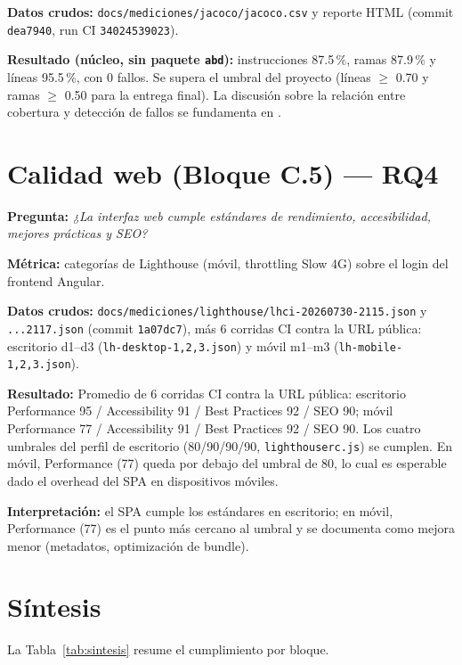 \textbf{Datos crudos:} \texttt{docs/mediciones/jacoco/jacoco.csv} y reporte HTML
(commit \texttt{dea7940}, run CI \texttt{34024539023}).

\textbf{Resultado (núcleo, sin paquete \texttt{abd}):} instrucciones 87.5\,\%,
ramas 87.9\,\% y líneas 95.5\,\%, con 0 fallos. Se supera el umbral del proyecto
(líneas $\ge$ 0.70 y ramas $\ge$ 0.50 para la entrega final). La discusión sobre la relación entre cobertura y detección de fallos se
fundamenta en \cite{inozemtseva2014,gopinath2014,gligoric2013,ivankovic2019}.

\section{Calidad web (Bloque C.5) — RQ4}
\label{sec:lighthouse}

\textbf{Pregunta:} \emph{¿La interfaz web cumple estándares de rendimiento,
accesibilidad, mejores prácticas y SEO?}

\textbf{Métrica:} categorías de Lighthouse \cite{lighthouse} (móvil, throttling Slow 4G)
sobre el login del frontend Angular.

\textbf{Datos crudos:} \texttt{docs/mediciones/lighthouse/lhci-20260730-2115.json} y
\texttt{...2117.json} (commit \texttt{1a07dc7}), más 6 corridas CI contra la URL
pública: escritorio d1--d3 (\texttt{lh-desktop-{1,2,3}.json}) y móvil m1--m3
(\texttt{lh-mobile-{1,2,3}.json}).

\textbf{Resultado:} Promedio de 6 corridas CI contra la URL pública: escritorio
Performance 95 / Accessibility 91 / Best Practices 92 / SEO 90; móvil Performance
77 / Accessibility 91 / Best Practices 92 / SEO 90. Los cuatro umbrales del
perfil de escritorio (80/90/90/90, \texttt{lighthouserc.js}) se cumplen. En móvil,
Performance (77) queda por debajo del umbral de 80, lo cual es esperable dado el
overhead del SPA en dispositivos móviles.

\textbf{Interpretación:} el SPA cumple los estándares en escritorio; en móvil,
Performance (77) es el punto más cercano al umbral y se documenta como mejora
menor (metadatos, optimización de bundle).

\section{Síntesis}
\label{sec:sintesis}

La Tabla~\ref{tab:sintesis} resume el cumplimiento por bloque.

